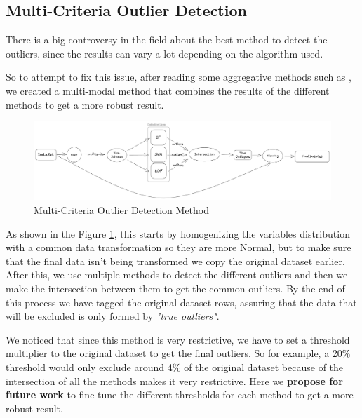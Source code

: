 \documentclass[11pt,english,a4paper,hidelinks]{book}
\begin{document}
\subsection{Multi-Criteria Outlier Detection}

There is a big controversy in the field about the best method to detect the outliers, since the results can vary a lot depending on the algorithm used.

\vspace{0.5cm}
\noindent So to attempt to fix this issue, after reading some aggregative methods such as \textcite{abro2020stacking}, we created a multi-modal method that combines the results of the different methods to get a more robust result.

\begin{figure}[H]
    \centering
    \includegraphics[width=1\textwidth]{images/code/outliers/multimodal.png}
    \caption{Multi-Criteria Outlier Detection Method}
    \label{fig:multimodal}
\end{figure}


\vspace{0.5cm}
\noindent As shown in the Figure \ref{fig:multimodal}, this starts by homogenizing the variables distribution with a common data transformation so they are more Normal, but to make sure that the final data isn't being transformed we copy the original dataset earlier. After this, we use multiple methods to detect the different outliers and then we make the intersection between them to get the common outliers. By the end of this process we have tagged the original dataset rows, assuring that the data that will be excluded is only formed by \textit{"true outliers"}.

\vspace{0.5cm}
\noindent We noticed that since this method is very restrictive, we have to set a threshold multiplier to the original dataset to get the final outliers. So for example, a 20\% threshold would only exclude around 4\% of the original dataset because of the intersection of all the methods makes it very restrictive. Here we \textbf{propose for future work} to fine tune the different thresholds for each method to get a more robust result.
\end{document}
